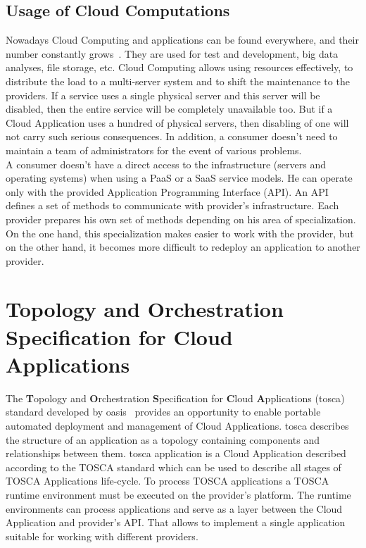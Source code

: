 \subsection*{Usage of Cloud Computations}
Nowadays Cloud Computing and applications can be found everywhere, and their number constantly grows~\cite*{cloud_stat}.
They are used for test and development, big data analyses, file storage, etc.
Cloud Computing allows using resources effectively, to distribute the load to a multi-server system and to shift the maintenance to the providers. 
If  a service uses a single physical server and this server will be disabled, then the entire service will be completely unavailable too.
But if a Cloud Application uses a hundred of physical servers, then disabling of one will not carry such serious consequences.
In addition, a consumer doesn't need to maintain a team of administrators for the event of various problems.\\
A consumer doesn't have a direct access to the infrastructure (servers and operating systems) when using a PaaS or a SaaS service models. 
He can operate only with the provided Application Programming Interface (API).
An API defines a set of methods to communicate with provider's infrastructure. 
Each provider prepares his own set of methods depending on his area of specialization. 
On the one hand, this specialization makes easier to work with the provider, but on the other hand, it becomes more difficult to redeploy an application to another provider.
\section{Topology and Orchestration Specification for Cloud	Applications} \label{sec:tosca}
The \textbf{T}opology and \textbf{O}rchestration \textbf{S}pecification for \textbf{C}loud \textbf{A}pplications (\gls{tosca}) standard developed by \gls{oasis}~\cite{oasis} provides an opportunity to enable portable automated deployment and management of Cloud Applications.
\gls{tosca} describes the structure of an application as a topology containing components and relationships between them.
\gls{tosca} application is a Cloud Application described according to the TOSCA standard which can be used to describe all stages of TOSCA Applications life-cycle.
To process TOSCA applications a TOSCA runtime environment must be executed on the provider's platform. 
The runtime environments can process applications and serve as a layer between the Cloud Application and provider's API.
That allows to implement a single application suitable for working with different providers. 
